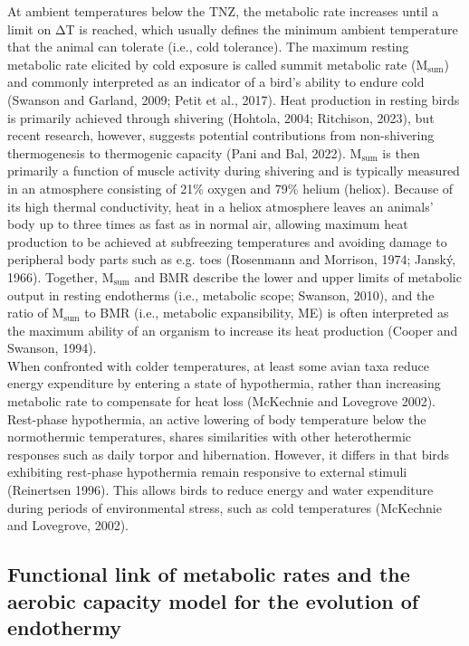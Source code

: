 \documentclass[10pt, twoside]{book} %
\begin{document}
	At ambient temperatures below the TNZ, the metabolic rate increases until a limit on ΔT is reached, which usually defines the minimum ambient temperature that the animal can tolerate (i.e., cold tolerance). The maximum resting metabolic rate elicited by cold exposure is called summit metabolic rate (M$_{\text{sum}}$) and commonly interpreted as an indicator of a bird’s ability to endure cold (Swanson and Garland, 2009; Petit et al., 2017). Heat production in resting birds is primarily achieved through shivering (Hohtola, 2004; Ritchison, 2023), but recent research, however, suggests potential contributions from non-shivering thermogenesis to thermogenic capacity (Pani and Bal, 2022). M$_{\text{sum}}$ is then primarily a function of muscle activity during shivering and is typically measured in an atmosphere consisting of 21\% oxygen and 79\% helium (heliox). Because of its high thermal conductivity, heat in a heliox atmosphere leaves an animals' body up to three times as fast as in normal air, allowing maximum heat production to be achieved at subfreezing temperatures and avoiding damage to peripheral body parts such as e.g. toes (Rosenmann and Morrison, 1974; Janský, 1966). Together, M$_{\text{sum}}$ and BMR describe the lower and upper limits of metabolic output in resting endotherms (i.e., metabolic scope; Swanson, 2010), and the ratio of M$_{\text{sum}}$ to BMR (i.e., metabolic expansibility, ME) is often interpreted as the maximum ability of an organism to increase its heat production (Cooper and Swanson, 1994).\\

	When confronted with colder temperatures, at least some avian taxa reduce energy expenditure by entering a state of hypothermia, rather than increasing metabolic rate to compensate for heat loss (McKechnie and Lovegrove 2002). Rest-phase hypothermia, an active lowering of body temperature below the normothermic temperatures, shares similarities with other heterothermic responses such as daily torpor and hibernation. However, it differs in that birds exhibiting rest-phase hypothermia remain responsive to external stimuli (Reinertsen 1996). This allows birds to reduce energy and water expenditure during periods of environmental stress, such as cold temperatures (McKechnie and Lovegrove, 2002).\\

\subsection{Functional link of metabolic rates and the aerobic capacity model for the evolution of endothermy}
\end{document}
